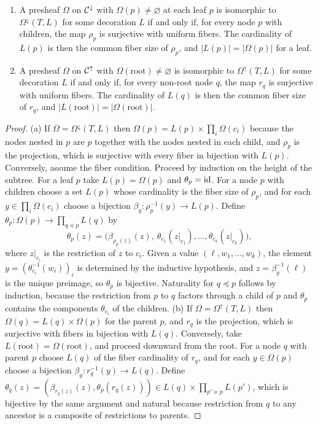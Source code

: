\begin{theorem}\label{thm:treerep}
\begin{enumerate}[label=(\alph*)]
\item A presheaf $\Omega$ on $\mathcal C^{\downarrow}$ with $\Omega(p)\neq\varnothing$ at each leaf $p$ is isomorphic to $\Omega^{\downarrow}(T,L)$ for some decoration $L$ if and only if, for every node $p$ with children, the map $\rho_p$ is surjective with uniform fibers. The cardinality of $L(p)$ is then the common fiber size of $\rho_p$, and $|L(p)|=|\Omega(p)|$ for a leaf.
\item A presheaf $\Omega$ on $\mathcal C^{\uparrow}$ with $\Omega(\mathrm{root})\neq\varnothing$ is isomorphic to $\Omega^{\uparrow}(T,L)$ for some decoration $L$ if and only if, for every non-root node $q$, the map $r_q$ is surjective with uniform fibers. The cardinality of $L(q)$ is then the common fiber size of $r_q$, and $|L(\mathrm{root})|=|\Omega(\mathrm{root})|$.
\end{enumerate}
\end{theorem}
\begin{proof}
(a) If $\Omega=\Omega^{\downarrow}(T,L)$ then $\Omega(p)=L(p)\times\prod_i\Omega(c_i)$ because the nodes nested in $p$ are $p$ together with the nodes nested in each child, and $\rho_p$ is the projection, which is surjective with every fiber in bijection with $L(p)$. Conversely, assume the fiber condition. Proceed by induction on the height of the subtree. For a leaf $p$ take $L(p)=\Omega(p)$ and $\theta_p=\mathrm{id}$. For a node $p$ with children choose a set $L(p)$ whose cardinality is the fiber size of $\rho_p$, and for each $y\in\prod_i\Omega(c_i)$ choose a bijection $\beta_y:\rho_p^{-1}(y)\to L(p)$. Define $\theta_p:\Omega(p)\to\prod_{q\preceq p}L(q)$ by
\[
\theta_p(z)=\bigl(\beta_{\rho_p(z)}(z),\ \theta_{c_1}(z|_{c_1}),\dots,\theta_{c_k}(z|_{c_k})\bigr),
\]
where $z|_{c_i}$ is the restriction of $z$ to $c_i$. Given a value $(\ell,w_1,\dots,w_k)$, the element $y=(\theta_{c_i}^{-1}(w_i))_i$ is determined by the inductive hypothesis, and $z=\beta_y^{-1}(\ell)$ is the unique preimage, so $\theta_p$ is bijective. Naturality for $q\preceq p$ follows by induction, because the restriction from $p$ to $q$ factors through a child of $p$ and $\theta_p$ contains the components $\theta_{c_i}$ of the children. (b) If $\Omega=\Omega^{\uparrow}(T,L)$ then $\Omega(q)=L(q)\times\Omega(p)$ for the parent $p$, and $r_q$ is the projection, which is surjective with fibers in bijection with $L(q)$. Conversely, take $L(\mathrm{root})=\Omega(\mathrm{root})$, and proceed downward from the root. For a node $q$ with parent $p$ choose $L(q)$ of the fiber cardinality of $r_q$, and for each $y\in\Omega(p)$ choose a bijection $\beta_y:r_q^{-1}(y)\to L(q)$. Define $\theta_q(z)=(\beta_{r_q(z)}(z),\theta_p(r_q(z)))\in L(q)\times\prod_{p'\succeq p}L(p')$, which is bijective by the same argument and natural because restriction from $q$ to any ancestor is a composite of restrictions to parents.
\end{proof}

